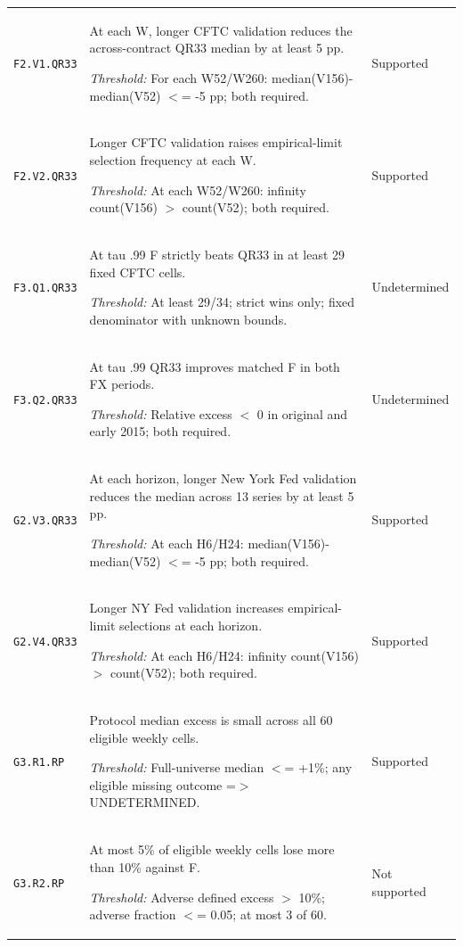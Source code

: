 \documentclass[12pt,a4paper]{article}
\begin{document}
{\begin{longtable}{p{2.0cm}p{10.5cm}p{2.5cm}}
\texttt{F2.\allowbreak{}V1.\allowbreak{}QR33} & At each W, longer CFTC validation reduces the across-contract QR33 median by at least 5 pp.\par\emph{Threshold:} For each W52/\allowbreak{}W260: median(V156)-median(V52) \ensuremath{<}=\allowbreak{} -5 pp; both required. & Supported \\[3pt]
\texttt{F2.\allowbreak{}V2.\allowbreak{}QR33} & Longer CFTC validation raises empirical-limit selection frequency at each W.\par\emph{Threshold:} At each W52/\allowbreak{}W260: infinity count(V156) \ensuremath{>} count(V52); both required. & Supported \\[3pt]
\texttt{F3.\allowbreak{}Q1.\allowbreak{}QR33} & At tau .99 F strictly beats QR33 in at least 29 fixed CFTC cells.\par\emph{Threshold:} At least 29/\allowbreak{}34; strict wins only; fixed denominator with unknown bounds. & Undetermined \\[3pt]
\texttt{F3.\allowbreak{}Q2.\allowbreak{}QR33} & At tau .99 QR33 improves matched F in both FX periods.\par\emph{Threshold:} Relative excess \ensuremath{<} 0 in original and early 2015; both required. & Undetermined \\[3pt]
\texttt{G2.\allowbreak{}V3.\allowbreak{}QR33} & At each horizon, longer New York Fed validation reduces the median across 13 series by at least 5 pp.\par\emph{Threshold:} At each H6/\allowbreak{}H24: median(V156)-median(V52) \ensuremath{<}=\allowbreak{} -5 pp; both required. & Supported \\[3pt]
\texttt{G2.\allowbreak{}V4.\allowbreak{}QR33} & Longer NY Fed validation increases empirical-limit selections at each horizon.\par\emph{Threshold:} At each H6/\allowbreak{}H24: infinity count(V156) \ensuremath{>} count(V52); both required. & Supported \\[3pt]
\texttt{G3.\allowbreak{}R1.\allowbreak{}RP} & Protocol median excess is small across all 60 eligible weekly cells.\par\emph{Threshold:} Full-universe median \ensuremath{<}=\allowbreak{} +1\%; any eligible missing outcome =\allowbreak{}\ensuremath{>} UNDETERMINED. & Supported \\[3pt]
\texttt{G3.\allowbreak{}R2.\allowbreak{}RP} & At most 5\% of eligible weekly cells lose more than 10\% against F.\par\emph{Threshold:} Adverse defined excess \ensuremath{>} 10\%; adverse fraction \ensuremath{<}=\allowbreak{} 0.05; at most 3 of 60. & Not supported \\[3pt]

\end{longtable}}
\end{document}
